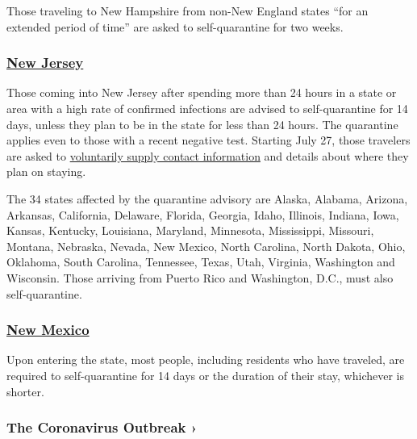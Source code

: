 Those traveling to New Hampshire from non-New England states ``for an
extended period of time'' are asked to self-quarantine for two weeks.

\hypertarget{new-jersey}{%
\subsubsection{\texorpdfstring{\href{https://covid19.nj.gov/faqs/nj-information/general-public/which-states-are-on-the-travel-advisory-list-are-there-travel-restrictions-to-or-from-new-jersey}{New
Jersey}}{New Jersey}}\label{new-jersey}}

Those coming into New Jersey after spending more than 24 hours in a
state or area with a high rate of confirmed infections are advised to
self-quarantine for 14 days, unless they plan to be in the state for
less than 24 hours. The quarantine applies even to those with a recent
negative test. Starting July 27, those travelers are asked to
\href{https://covid19.nj.gov/forms/njtravel}{voluntarily supply contact
information} and details about where they plan on staying.

The 34 states affected by the quarantine advisory are Alaska, Alabama,
Arizona, Arkansas, California, Delaware, Florida, Georgia, Idaho,
Illinois, Indiana, Iowa, Kansas, Kentucky, Louisiana, Maryland,
Minnesota, Mississippi, Missouri, Montana, Nebraska, Nevada, New Mexico,
North Carolina, North Dakota, Ohio, Oklahoma, South Carolina, Tennessee,
Texas, Utah, Virginia, Washington and Wisconsin. Those arriving from
Puerto Rico and Washington, D.C., must also self-quarantine.

\hypertarget{new-mexico}{%
\subsubsection{\texorpdfstring{\href{https://www.newmexico.org/covid-19-traveler-information/}{New
Mexico}}{New Mexico}}\label{new-mexico}}

Upon entering the state, most people, including residents who have
traveled, are required to self-quarantine for 14 days or the duration of
their stay, whichever is shorter.

\href{https://www.nytimes.com/news-event/coronavirus?action=click\&pgtype=Article\&state=default\&region=MAIN_CONTENT_3\&context=storylines_faq}{}

\hypertarget{the-coronavirus-outbreak-}{%
\subsubsection{The Coronavirus Outbreak
›}\label{the-coronavirus-outbreak-}}

